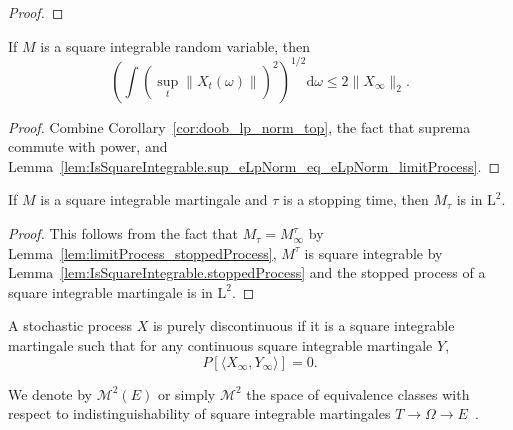 \begin{proof}

\end{proof}


\begin{lemma}\label{lem:IsSquareIntegrable.integral_iSup_norm_rpow_rpow_inv_le_limitProcess}
  \leanok
If $M$ is a square integrable random variable, then
$$\left(\int (\sup_t \|X_t(\omega)\|)^2\right)^{1/2} \mathrm d\omega \le 2 \|X_\infty\|_2.$$
\end{lemma}

\begin{proof}
  \leanok
Combine Corollary~\ref{cor:doob_lp_norm_top}, the fact that suprema commute with power, and Lemma~\ref{lem:IsSquareIntegrable.sup_eLpNorm_eq_eLpNorm_limitProcess}.
\end{proof}


\begin{lemma}\label{lem:memLp_two_stoppedValue}
  \leanok
If $M$ is a square integrable martingale and $\tau$ is a stopping time, then $M_\tau$ is in $\mathrm L^2$.
\end{lemma}

\begin{proof}
  \leanok
This follows from the fact that $M_\tau = M^\tau_\infty$ by Lemma~\ref{lem:limitProcess_stoppedProcess}, $M^\tau$ is square integrable by Lemma~\ref{lem:IsSquareIntegrable.stoppedProcess} and the stopped process of a square integrable martingale is in $\mathrm L^2$.
\end{proof}


\begin{definition}\label{def:IsPurelyDiscontinuous}
  \leanok
A stochastic process $X$ is purely discontinuous if it is a square integrable martingale such that for any continuous square integrable martingale $Y$,
$$P[\langle X_\infty, Y_\infty\rangle] = 0.$$
\end{definition}


\begin{definition}\label{def:L2Martingales}
  \leanok
We denote by $\mathcal{M}^2(E)$ or simply $\mathcal{M}^2$ the space of equivalence classes with respect to indistinguishability of square integrable martingales $T \to \Omega \to E$~.
\end{definition}


